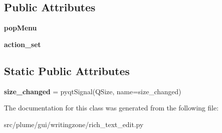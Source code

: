 \subsection*{Public Attributes}
\begin{DoxyCompactItemize}
\item 
{\bfseries pop\+Menu}\hypertarget{classplume-creator_1_1src_1_1plume_1_1gui_1_1writingzone_1_1rich__text__edit_1_1_rich_text_edit_ad54e70cac15aefe61f2e3adcf5f7d104}{}\label{classplume-creator_1_1src_1_1plume_1_1gui_1_1writingzone_1_1rich__text__edit_1_1_rich_text_edit_ad54e70cac15aefe61f2e3adcf5f7d104}

\item 
{\bfseries action\+\_\+set}\hypertarget{classplume-creator_1_1src_1_1plume_1_1gui_1_1writingzone_1_1rich__text__edit_1_1_rich_text_edit_ac55a3f23a7186e53a154a26acaff9146}{}\label{classplume-creator_1_1src_1_1plume_1_1gui_1_1writingzone_1_1rich__text__edit_1_1_rich_text_edit_ac55a3f23a7186e53a154a26acaff9146}

\end{DoxyCompactItemize}
\subsection*{Static Public Attributes}
\begin{DoxyCompactItemize}
\item 
{\bfseries size\+\_\+changed} = pyqt\+Signal(\textquotesingle{}Q\+Size\textquotesingle{}, name=\textquotesingle{}size\+\_\+changed\textquotesingle{})\hypertarget{classplume-creator_1_1src_1_1plume_1_1gui_1_1writingzone_1_1rich__text__edit_1_1_rich_text_edit_aad46ec14ab23f05ba66b636f4d5c7404}{}\label{classplume-creator_1_1src_1_1plume_1_1gui_1_1writingzone_1_1rich__text__edit_1_1_rich_text_edit_aad46ec14ab23f05ba66b636f4d5c7404}

\end{DoxyCompactItemize}


The documentation for this class was generated from the following file\+:\begin{DoxyCompactItemize}
\item 
src/plume/gui/writingzone/rich\+\_\+text\+\_\+edit.\+py\end{DoxyCompactItemize}
